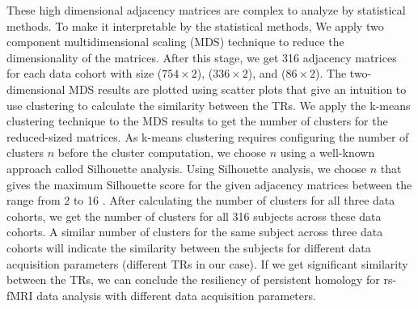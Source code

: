 These high dimensional adjacency matrices are complex to analyze by statistical methods. To make it interpretable by the statistical methods, We apply two component multidimensional scaling (MDS) technique to reduce the dimensionality of the matrices. After this stage, we get 316 adjacency matrices for each data cohort with size ($ 754 \times 2 $), ($ 336 \times 2 $), and ($ 86 \times 2 $). The two-dimensional MDS results are plotted using scatter plots that give an intuition to use clustering to calculate the similarity between the TRs. We apply the k-means clustering technique to the MDS results to get the number of clusters for the reduced-sized matrices. As k-means clustering requires configuring the number of clusters $n$ before the cluster computation, we choose $n$ using a well-known approach called Silhouette analysis. Using Silhouette analysis, we choose $n$ that gives the maximum Silhouette score for the given adjacency matrices between the range from 2 to 16 \cite{scikit-learn, rousseeuw1987silhouettes}. After calculating the number of clusters for all three data cohorts, we get the number of clusters for all 316 subjects across these data cohorts. A similar number of clusters for the same subject across three data cohorts will indicate the similarity between the subjects for different data acquisition parameters (different TRs in our case). If we get significant similarity between the TRs, we can conclude the resiliency of persistent homology for rs-fMRI data analysis with different data acquisition parameters.



